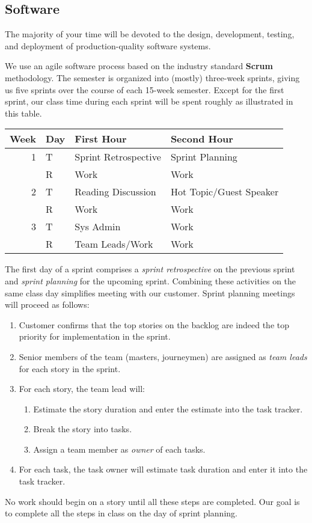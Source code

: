 \documentclass{article}
\begin{document}
\subsection{Software}
\label{sec:orgheadline10}
The majority of your time will be devoted to the design, development,
testing, and deployment of production-quality software systems.

We use an agile software process based on the industry standard \textbf{Scrum} methodology.
The semester is organized into (mostly) three-week sprints,
giving us five sprints over the course of each 15-week semester.
Except for the first sprint, our class time during each sprint will be spent roughly as
illustrated in this table.

\begin{center}
\begin{tabular}{rlll}
\toprule
Week & Day & First Hour & Second Hour\\
\midrule
1 & T & Sprint Retrospective & Sprint Planning\\
 & R & Work & Work\\
\midrule
2 & T & Reading Discussion & Hot Topic/Guest Speaker\\
 & R & Work & Work\\
\midrule
3 & T & Sys Admin & Work\\
 & R & Team Leads/Work & Work\\
\bottomrule
\end{tabular}
\end{center}

The first day of a sprint comprises
a \emph{sprint retrospective} on the previous sprint
and \emph{sprint planning} for the upcoming sprint.
Combining these activities on the same class day
simplifies meeting with our customer.
Sprint planning meetings will proceed as follows:
\begin{enumerate}
\item Customer confirms that the top stories on the backlog
are indeed the top priority for implementation in the sprint.
\item Senior members of the team (masters, journeymen) are assigned as \emph{team leads}
   for each story in the sprint.
\item For each story, the team lead will:
\begin{enumerate}
\item Estimate the story duration and enter the estimate into the task tracker.
\item Break the story into tasks.
\item Assign a team member as \emph{owner} of each tasks.
\end{enumerate}
\item For each task, the task owner will estimate task duration and enter it into the task tracker.
\end{enumerate}
No work should begin on a story until all these steps are completed.
Our goal is to complete all the steps in class on the day of sprint planning.
\end{document}
